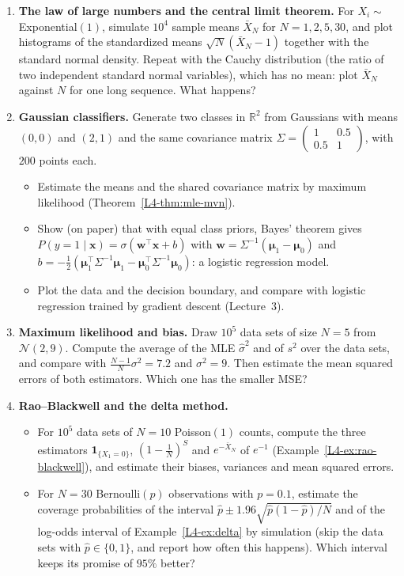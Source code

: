 \begin{enumerate}[label=\textbf{P\arabic*.}, leftmargin=*]
    \item \textbf{The law of large numbers and the central limit theorem.} For $X_i \sim$ Exponential$(1)$, simulate $10^4$ sample means $\bar X_N$ for $N = 1, 2, 5, 30$, and plot histograms of the standardized means $\sqrt{N}(\bar X_N - 1)$ together with the standard normal density. Repeat with the Cauchy distribution (the ratio of two independent standard normal variables), which has no mean: plot $\bar X_N$ against $N$ for one long sequence. What happens?

    \item \textbf{Gaussian classifiers.} Generate two classes in $\mathbb{R}^2$ from Gaussians with means $(0, 0)$ and $(2, 1)$ and the same covariance matrix $\Sigma = \begin{pmatrix} 1 & 0.5 \\ 0.5 & 1 \end{pmatrix}$, with $200$ points each.
    \begin{itemize}
        \item Estimate the means and the shared covariance matrix by maximum likelihood (Theorem~\ref{L4-thm:mle-mvn}).
        \item Show (on paper) that with equal class priors, Bayes' theorem gives $P(y = 1 \mid \mathbf{x}) = \sigma(\mathbf{w}^\top\mathbf{x} + b)$ with $\mathbf{w} = \Sigma^{-1}(\boldsymbol{\mu}_1 - \boldsymbol{\mu}_0)$ and $b = -\frac{1}{2}(\boldsymbol{\mu}_1^\top\Sigma^{-1}\boldsymbol{\mu}_1 - \boldsymbol{\mu}_0^\top\Sigma^{-1}\boldsymbol{\mu}_0)$: a logistic regression model.
        \item Plot the data and the decision boundary, and compare with logistic regression trained by gradient descent (Lecture~3).
    \end{itemize}

    \item \homework{} \textbf{Maximum likelihood and bias.} Draw $10^5$ data sets of size $N = 5$ from $\mathcal{N}(2, 9)$. Compute the average of the MLE $\hat\sigma^2$ and of $s^2$ over the data sets, and compare with $\frac{N - 1}{N}\sigma^2 = 7.2$ and $\sigma^2 = 9$. Then estimate the mean squared errors of both estimators. Which one has the smaller MSE?

    \item \textbf{Rao--Blackwell and the delta method.}
    \begin{itemize}
        \item For $10^5$ data sets of $N = 10$ Poisson$(1)$ counts, compute the three estimators $\mathbf{1}_{\{X_1 = 0\}}$, $(1 - \frac{1}{N})^S$ and $e^{-\bar X_N}$ of $e^{-1}$ (Example~\ref{L4-ex:rao-blackwell}), and estimate their biases, variances and mean squared errors.
        \item For $N = 30$ Bernoulli$(p)$ observations with $p = 0.1$, estimate the coverage probabilities of the interval $\hat p \pm 1.96\sqrt{\hat p(1 - \hat p)/N}$ and of the log-odds interval of Example~\ref{L4-ex:delta} by simulation (skip the data sets with $\hat p \in \{0, 1\}$, and report how often this happens). Which interval keeps its promise of $95\%$ better?
    \end{itemize}


\end{enumerate}
